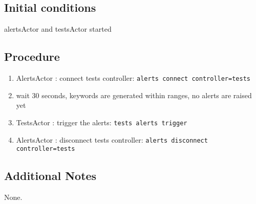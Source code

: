 \subsection{Initial conditions}

alertsActor and testsActor started

\subsection{Procedure}
\label{sec:alerts-proc}

\begin{enumerate}
    \item AlertsActor : connect tests controller: \texttt{alerts connect controller=tests}
    \item wait 30 seconds, keywords are generated within ranges, no alerts are raised yet
    \item TestsActor : trigger the alerts: \texttt{tests alerts trigger}
    \item AlertsActor : disconnect tests controller: \texttt{alerts disconnect controller=tests}
\end{enumerate}

\subsection{Additional Notes}
None.
